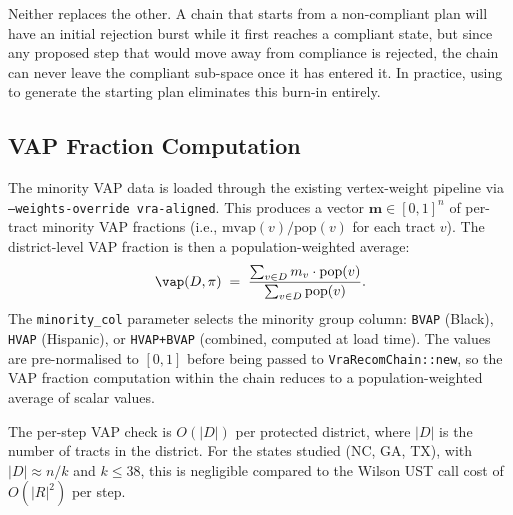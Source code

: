 Neither replaces the other.
A chain that starts from a non-compliant plan will have an initial rejection
burst while it first reaches a compliant state, but since any proposed step
that would move away from compliance is rejected, the chain can never leave
the compliant sub-space once it has entered it.
In practice, using \vraSection{} to generate the starting plan eliminates this
burn-in entirely.

\subsection{VAP Fraction Computation}

The minority VAP data is loaded through the existing vertex-weight pipeline
via \texttt{--weights-override vra-aligned}.
This produces a vector $\mathbf{m} \in [0,1]^n$ of per-tract minority VAP
fractions (i.e., $\mathrm{mvap}(v) / \mathrm{pop}(v)$ for each tract $v$).
The district-level VAP fraction is then a population-weighted average:
\[
  \vap(D, \pi) \;=\;
  \frac{\sum_{v \in D} m_v \cdot \mathrm{pop}(v)}{\sum_{v \in D} \mathrm{pop}(v)}.
\]
The \texttt{minority\_col} parameter selects the minority group column:
\texttt{BVAP} (Black), \texttt{HVAP} (Hispanic), or \texttt{HVAP+BVAP}
(combined, computed at load time).
The values are pre-normalised to $[0,1]$ before being passed to
\texttt{VraRecomChain::new}, so the VAP fraction computation within the
chain reduces to a population-weighted average of scalar values.

The per-step VAP check is $O(|D|)$ per protected district, where $|D|$ is
the number of tracts in the district.
For the states studied (NC, GA, TX), with $|D| \approx n/k$ and
$k \leq 38$, this is negligible compared to the Wilson UST call cost of
$O(|R|^2)$ per step.